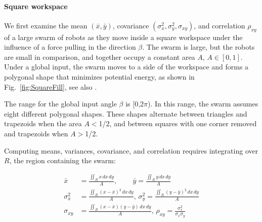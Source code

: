 \paragraph{Square workspace}
We first examine the mean $(\bar{x},\bar{y})$, covariance $(\sigma^2_x,\sigma^2_y,\sigma_{xy})$, and correlation $\rho_{xy}$ of a large swarm of robots as they move inside a square workspace under the influence of a force pulling in the direction $\beta$. The swarm is large, but the robots are small in comparison, and together occupy a constant area $A$, $A\in [0,1]$. Under a global input, the swarm moves to a side of the workspace and forms a polygonal shape that minimizes potential energy, as shown in Fig.~\ref{fig:SquareFill},  see also \citep{Zhao2016mathematicaSquare}.

The range for the global input angle $\beta $ is [0,2$\pi $). In this range, the swarm assumes eight different polygonal shapes. 
These shapes alternate between triangles and trapezoids when the area $A$$<$1/2, and between squares with one corner removed and trapezoids when $A$$>$1/2.

Computing means, variances, covariance, and correlation requires integrating over $R$, the region containing the swarm:  %

\begin{align}
\bar{x} &=\frac{\iint_R x \,dx\,dy}{A} \label{eq:meanInSquareWorkspace}
\text{, }\qquad \bar{y}=\frac{\iint_R y \,dx\,dy}{A} \\
\sigma^2_x &=\frac{\iint_R \left(x-\bar{x}\right)^2  \,dx \,dy}{A}  \label{eq:varInSquareWorkspace}
\text{, } \sigma^2_y =\frac{\iint_R  \left(y-\bar{y}\right)^2 \,dx \,dy}{A}\\
\sigma_{xy} &= \frac{\iint_R  \left(x-\bar{x}\right) \left(y-\bar{y}\right) \, dx \,dy}{A} \label{eq:covAndcorrInSquareWorkspace}
\text{, }\rho_{xy} = \frac{\sigma^2_x}{\sigma_x\sigma_y}
\end{align}

